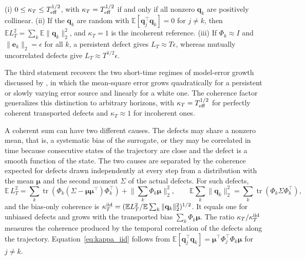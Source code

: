 \begin{proposition}
\label{prop:coherence}
(i) $0\le\kappa_T\le T_{\rm eff}^{1/2}$, with $\kappa_T=T_{\rm eff}^{1/2}$ if and only if all nonzero $\mathbf q_k$ are positively collinear. (ii) If the $\mathbf q_k$ are random with $\mathbb E[\mathbf q_j^\top\mathbf q_k]=0$ for $j\ne k$, then $\mathbb E L_T^2=\sum_k\mathbb E\|\mathbf q_k\|_2^2$, and $\kappa_T=1$ is the incoherent reference. (iii) If $\Phi_k\approx I$ and $\|\mathbf e_k\|_2=\epsilon$ for all $k$, a persistent defect gives $L_T\approx T\epsilon$, whereas mutually uncorrelated defects give $L_T\approx T^{1/2}\epsilon$.
\end{proposition}

The third statement recovers the two short-time regimes of model-error growth discussed by \citet{vannitsem2002}, in which the mean-square error grows quadratically for a persistent or slowly varying error source and linearly for a white one. The coherence factor generalizes this distinction to arbitrary horizons, with $\kappa_T=T_{\rm eff}^{1/2}$ for perfectly coherent transported defects and $\kappa_T\approx1$ for incoherent ones.

A coherent sum can have two different causes. The defects may share a nonzero mean, that is, a systematic bias of the surrogate, or they may be correlated in time because consecutive states of the trajectory are close and the defect is a smooth function of the state. The two causes are separated by the coherence expected for defects drawn independently at every step from a distribution with the mean $\boldsymbol\mu$ and the second moment $\Sigma$ of the actual defects. For such defects,
\begin{equation}
  \mathbb E\,L_T^2=\sum_k\operatorname{tr}\!\left(\Phi_k(\Sigma-\boldsymbol\mu\boldsymbol\mu^\top)\Phi_k^\top\right)+\Big\|\sum_k\Phi_k\boldsymbol\mu\Big\|_2^2,
  \qquad
  \mathbb E\sum_k\|\mathbf q_k\|_2^2=\sum_k\operatorname{tr}\!\left(\Phi_k\Sigma\Phi_k^\top\right),
  \label{eq:kappa_iid}
\end{equation}
and the bias-only coherence is $\kappa^{\rm iid}_T=(\mathbb E L_T^2/\mathbb E\sum_k\|\mathbf q_k\|_2^2)^{1/2}$. It equals one for unbiased defects and grows with the transported bias $\sum_k\Phi_k\boldsymbol\mu$. The ratio $\kappa_T/\kappa^{\rm iid}_T$ measures the coherence produced by the temporal correlation of the defects along the trajectory. Equation~\eqref{eq:kappa_iid} follows from $\mathbb E[\mathbf q_j^\top\mathbf q_k]=\boldsymbol\mu^\top\Phi_j^\top\Phi_k\boldsymbol\mu$ for $j\neq k$.

